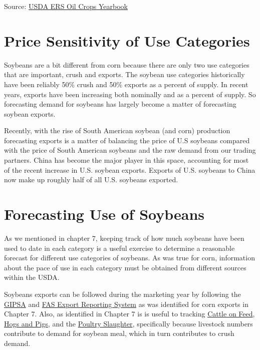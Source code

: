 \documentclass[]{book}
\theoremstyle{definition}
\theoremstyle{definition}
\theoremstyle{remark}
\begin{document}
Source:
\href{http://www.ers.usda.gov/data-products/oil-crops-yearbook.aspx}{USDA
ERS Oil Crops Yearbook}

\section{Price Sensitivity of Use
Categories}\label{price-sensitivity-of-use-categories-1}

Soybeans are a bit different from corn because there are only two use
categories that are important, crush and exports. The soybean use
categories historically have been reliably 50\% crush and 50\% exports
as a percent of supply. In recent years, exports have been increasing
both nominally and as a percent of supply. So forecasting demand for
soybeans has largely become a matter of forecasting soybean exports.

Recently, with the rise of South American soybean (and corn) production
forecasting exports is a matter of balancing the price of U.S soybeans
compared with the price of South American soybeans and the raw demand
from our trading partners. China has become the major player in this
space, accounting for most of the recent increase in U.S. soybean
exports. Exports of U.S. soybeans to China now make up roughly half of
all U.S. soybeans exported.

\section{Forecasting Use of
Soybeans}\label{forecasting-use-of-soybeans-1}

As we mentioned in chapter 7, keeping track of how much soybeans have
been used to date in each category is a useful exercise to determine a
reasonable forecast for different use categories of soybeans. As was
true for corn, information about the pace of use in each category must
be obtained from different sources within the USDA.

Soybeans exports can be followed during the marketing year by following
the \href{}{GIPSA} and \href{}{FAS Export Reporting System} as was
identified for corn exports in Chapter 7. Also, as identified in Chapter
7 is is useful to tracking
\href{http://usda.mannlib.cornell.edu/MannUsda/viewDocumentInfo.do?documentID=1020}{Cattle
on Feed},
\href{http://usda.mannlib.cornell.edu/MannUsda/viewDocumentInfo.do?documentID=1086}{Hogs
and Pigs}, and the
\href{https://usda.mannlib.cornell.edu/MannUsda/viewDocumentInfo.do?documentID=1131}{Poultry
Slaughter}, specifically because livestock numbers contribute to demand
for soybean meal, which in turn contributes to crush demand.
\end{document}
